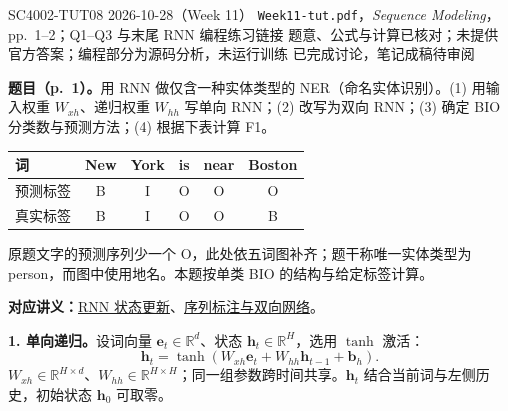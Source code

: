 
\begingroup
\linespread{1.15}\selectfont
\setlength{\parskip}{0.4em}
\renewcommand{\recordid}[1]{}
\renewcommand{\relatedtopic}[2]{\hyperref[topic:#1]{#2}}
\label{tutorial:SC4002-TUT08}

\tutorialmeta
  {SC4002-TUT08}
  {2026-10-28（Week 11）}
  {\texttt{Week11-tut.pdf}，\emph{Sequence Modeling}，pp.~1--2；Q1--Q3 与末尾 RNN 编程练习链接}
  {题意、公式与计算已核对；未提供官方答案；编程部分为源码分析，未运行训练}
  {已完成讨论，笔记成稿待审阅}

\nopagebreak[4]
\textbf{题目（p.~1）。}用 RNN 做仅含一种实体类型的 NER（命名实体识别）。(1) 用输入权重 $W_{xh}$、递归权重 $W_{hh}$ 写单向 RNN；(2) 改写为双向 RNN；(3) 确定 BIO 分类数与预测方法；(4) 根据下表计算 F1。
\begin{center}
\begin{tabular}{@{}lccccc@{}}
\toprule
词 & New & York & is & near & Boston \\
\midrule
预测标签 & B & I & O & O & O \\
真实标签 & B & I & O & O & B \\
\bottomrule
\end{tabular}
\end{center}
{\small 原题文字的预测序列少一个 O，此处依五词图补齐；题干称唯一实体类型为 person，而图中使用地名。本题按单类 BIO 的结构与给定标签计算。}

\textbf{对应讲义：}\relatedtopic{SC4002-L10-T01}{RNN 状态更新}、\relatedtopic{SC4002-L10-T03}{序列标注与双向网络}。

\textbf{1. 单向递归。}设词向量 $\mathbf e_t\in\mathbb R^d$、状态 $\mathbf h_t\in\mathbb R^H$，选用 $\tanh$ 激活：
\[
 \boxed{\mathbf h_t=\tanh(W_{xh}\mathbf e_t+W_{hh}\mathbf h_{t-1}+\mathbf b_h).}
\]
$W_{xh}\in\mathbb R^{H\times d}$、$W_{hh}\in\mathbb R^{H\times H}$；同一组参数跨时间共享。$\mathbf h_t$ 结合当前词与左侧历史，初始状态 $\mathbf h_0$ 可取零。

